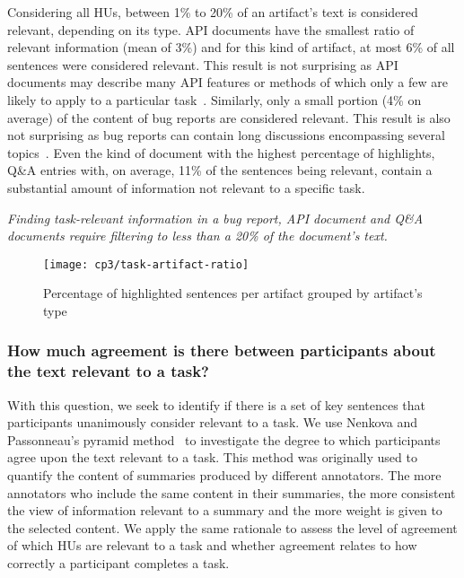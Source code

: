 Considering all HUs, between 1\% to 20\% of an artifact's text is considered relevant, depending on its type.
API documents have the smallest ratio of
relevant information (mean of 3\%) and for this kind of artifact,
at most 6\% of all sentences were considered relevant.
This result is not surprising as API documents may describe many API features or
methods of which only a few are likely to apply to
a particular task~\cite{robillard2011field}.
Similarly, only a small portion (4\% on average) of
the content of 
bug reports are considered relevant.
This result is also not
surprising as bug reports can contain long discussions encompassing
several topics~\cite{Breu2010, Rastkar2010}.
Even the kind of document with the highest
percentage of highlights, Q\&A entries with, on average, 11\%
of the sentences being relevant,
contain a substantial amount of information not relevant to a
specific task. 





\medskip
\begin{bluequote}
    \textit{Finding task-relevant information in a bug report,
    API document and Q\&A documents require filtering to less than
    a 20\% of the document's text.}
\end{bluequote}



\begin{figure}
    \centering
    \texttt{[image: cp3/task-artifact-ratio]}
    \caption{Percentage of highlighted sentences per artifact grouped by artifact's type}
    \label{fig:task-artifact-ratio}
\end{figure}

\subsubsection{How much agreement is there between participants about the text relevant to a task?}
\label{cp3:agreement}


With this question, we seek to identify if there is a set of key sentences that
participants unanimously consider relevant to a task. 
We use Nenkova and Passonneau's
pyramid method~\cite{Nenkova2004}
to investigate the degree to which participants agree upon
the text relevant to a task. This method was originally used
to quantify the content of summaries produced by different annotators.
The more annotators who include the same content in their summaries,
the more consistent the view of information relevant to a summary and
the more weight is given to the selected content. We apply the same rationale
to assess the level of agreement of which HUs are relevant to a task
and whether agreement relates to how correctly
a participant completes a task.




